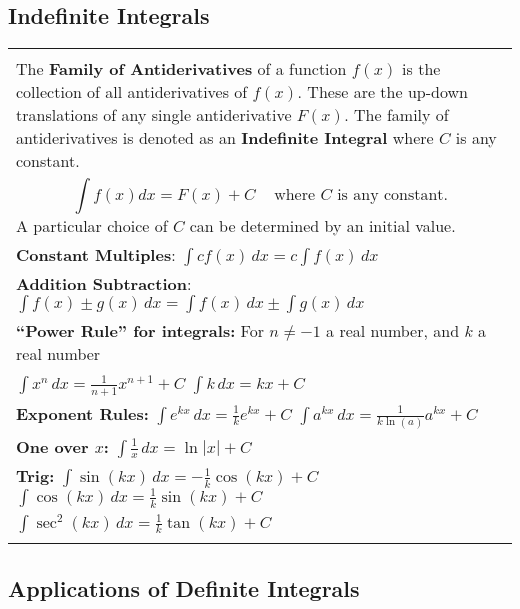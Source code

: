 \documentclass[12pt]{report}
\newenvironment{boxe}
    {\begin{center}
    \begin{tabular}{|p{0.9\textwidth}|}
    \hline\\
    }
    { 
    \\\\\hline
    \end{tabular} 
    \end{center}
    }
\begin{document}
\subsection*{Indefinite Integrals}
\begin{boxe}
The \textbf{Family of Antiderivatives} of a function $f(x)$ is the collection of all antiderivatives of $f(x)$. 
These are the up-down translations of any single antiderivative $F(x)$. The family of antiderivatives is 
denoted as an \textbf{Indefinite Integral} where $C$ is any constant.\\
 \[\int f(x) dx = F(x)+C \;\;\;\text{    where $C$ is any constant.}\]
 A particular choice of $C$ can be determined by an initial value.\\
\textbf{Constant Multiples}: $\displaystyle{\int cf(x)\,dx=c\int f(x)\,dx}$\\
\textbf{Addition Subtraction}: $\displaystyle{\int f(x)\pm g(x)\,dx=\int f(x)\,dx\pm \int g(x)\,dx}$\\
\textbf{``Power Rule'' for integrals: } For $n\neq -1$ a real number, and $k$ a real number\\
$\displaystyle{\int x^n\,dx=\frac{1}{n+1}x^{n+1}+C}$\;\;\;\;\; $\displaystyle{\int k\,dx=kx+C}$\\
\textbf{Exponent Rules: } $\displaystyle{\int e^{kx}\,dx=\frac{1}{k}e^{kx}+C}$\;\;\;\;\; $\displaystyle{\int a^{kx}\,dx=\frac{1}{k\ln(a)}a^{kx}+C}$\\
\textbf{One over $x$: } $\displaystyle{\int \frac{1}{x}\,dx=\ln |x|+C}$\\
\textbf{Trig: } $\displaystyle{\int \sin(kx)\,dx=-\frac{1}{k}\cos(kx)+C}$\;\;\;\;\; $\displaystyle{\int \cos(kx)\,dx=\frac{1}{k}\sin(kx)+C}$\\ \;\;\;$\displaystyle{\int \sec^2(kx)\,dx=\frac{1}{k}\tan(kx)+C}$
\end{boxe}
\iffalse\subsection*{Applications of Definite Integrals}
\end{document}
